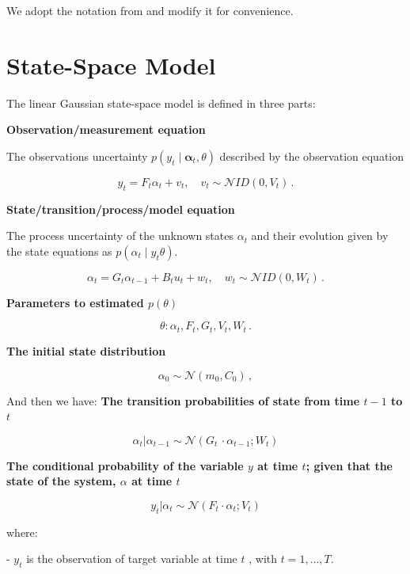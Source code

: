 

\label{chapter:appendixA}

%

We adopt the notation from \cite{Petris2008} and modify it for convenience. 


\section{State-Space Model}


The linear Gaussian state-space model is defined in three parts:



\textbf{Observation/measurement equation}


The observations uncertainty $p(y_{t} \mid \mathbf{\alpha}_{t},\theta)$ described by the observation equation

$$y_{t} = F_{t}\alpha_{t}+v_{t},\quad  v_{t}\sim \mathcal NID(0,V_{t}) \, .$$



\textbf{State/transition/process/model equation} 


The process uncertainty of the unknown states $\alpha_{t}$ and their evolution given by the state equations as $p(\alpha_{t} \mid y_{t} \theta)$.  


$$\alpha_{t} = G_{t}\alpha_{t-1}+B_{t} u_{t}+w_{t},\quad  w_{t}\sim \mathcal NID(0,W_{t})\, .$$


\textbf{Parameters to estimated $p(\theta)$ }


$$\theta : { \alpha_t, F_t,  G_t ,V_{t}, W_{t} }\, .$$


\textbf{The initial state distribution }



$$\alpha_{0}\sim \mathcal N(m_0,C_{0})\, ,$$

And then we have:
\textbf{The transition probabilities of state from time $t - 1$ to $t$ }

$$\alpha_t|\alpha_{t-1}   \sim \mathcal N( G_t \, \cdot \alpha_{t-1};W_t) $$

\textbf{The conditional probability of the variable $y$ at time $t$; given that the state of the system, $\alpha$ at time $t$ }

$$y_t|\alpha_t  \sim \mathcal N(F_t \cdot \alpha_t;V_t)$$


where: 


-  $y_{t}$ is the observation of target variable  at time $t$ , with $t = 1,..., T$.




